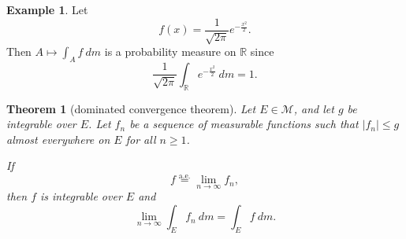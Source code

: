 \documentclass[a4paper,12pt]{scrreprt}
\newcommand{\R}{\mathbb{R}}
\theoremstyle{definition}
\newtheorem{example}[definition]{Example}
\theoremstyle{plain}
\newtheorem{theorem}[definition]{Theorem}
\theoremstyle{remark}
\begin{document}
\begin{example}
  Let
  \begin{equation*}
    f(x) = \frac{1}{\sqrt{2 \pi}} e^{-\frac{x^{2}}{2}}.
  \end{equation*}
  Then $A \mapsto \int_{A}f\ dm$ is a probability measure on $\R$ since
  \begin{equation*}
    \frac{1}{\sqrt{2\pi}} \int_{\R} e^{-\frac{x^2}{2}}\ dm = 1.
  \end{equation*}
\end{example}

\begin{theorem}[dominated convergence theorem]
  \label{thm:dominatedconvergencetheorem}
  Let $E \in \mathcal{M}$, and let $g$ be integrable over $E$. Let $f_{n}$ be a sequence of measurable functions such that $\left|f_{n}\right| \leq g$ almost everywhere on $E$ for all $n \geq 1$.

  If
  \begin{equation*}
    f \overset{\mathrm{a.e.}}{=} \lim_{n \to \infty} f_{n},
  \end{equation*}
  then $f$ is integrable over $E$ and
  \begin{equation*}
    \lim_{n \to \infty} \int_{E} f_{n}\ dm = \int_{E} f\ dm.
  \end{equation*}
\end{theorem}
\end{document}
